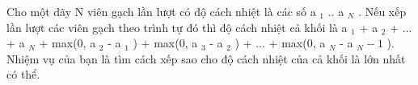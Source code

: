 Cho một dãy N viên gạch lần lượt có độ cách nhiệt là các số a   $_    1   $   .. a   $_    N   $   . Nếu xếp lần lượt các viên gạch theo trình tự đó thì độ cách nhiệt cả khối là a   $_    1   $   + a   $_    2   $   + ... + a   $_    N   $   + max(0, a   $_    2   $   - a   $_    1   $   ) + max(0, a   $_    3   $   - a   $_    2   $   ) + ... + max(0, a   $_    N   $   - a   $_    N - 1   $   ). Nhiệm vụ của bạn là tìm cách xếp sao cho độ cách nhiệt của cả khối là lớn nhất có thể.  

\